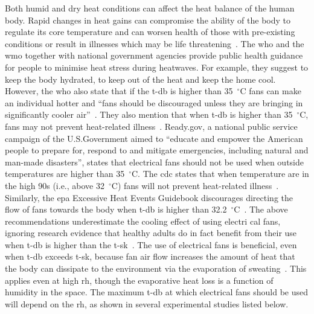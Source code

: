 Both humid and dry heat conditions can affect the heat balance of the human body.
Rapid changes in heat gains can compromise the ability of the body to regulate its core temperature and can worsen health of those with pre-existing conditions or result in illnesses which may be life threatening~\cite{WMO2015}.
The \ac{who} and the \ac{wmo} together with national government agencies provide public health guidance for people to minimise heat stress during heatwaves.
For example, they suggest to keep the body hydrated, to keep out of the heat and keep the home cool.
However, the \ac{who} also state that if the \ac{t-db} is higher than 35~$^{\circ}$C fans can make an individual hotter and ``fans should be discouraged unless they are bringing in significantly cooler air''~\cite{WMO2015}.
They also mention that when \ac{t-db} is higher than 35~$^{\circ}$C, fans may not prevent heat-related illness~\cite{HeatandH28:online}.
Ready.gov, a national public service campaign of the U.S.\@ Government aimed to ``educate and empower the American people to prepare for, respond to and mitigate emergencies, including natural and man-made disasters'', states that electrical fans should not be used when outside temperatures are higher than 35~$^{\circ}$C\@.
The \ac{cdc} states that when temperature are in the high 90s (i.e., above 32~$^{\circ}$C) fans will not prevent heat-related illness~\cite{ExtremeH66:online}.
Similarly, the \ac{epa} Excessive Heat Events Guidebook discourages directing the flow of fans towards the body when \ac{t-db} is higher than 32.2~$^{\circ}$C~\cite{UnitedStatesEnvironmentalProtectionAgency2006}.
The above recommendations underestimate the cooling effect of using electri cal fans, ignoring research evidence that healthy adults do in fact benefit from their use when \ac{t-db} is higher than the \ac{t-sk}~\cite{Rate2015, Jay2015, Jay2019a, Rate2015, Gagnon2017}.
The use of electrical fans is beneficial, even when \ac{t-db} exceeds \ac{t-sk}, because fan air flow increases the amount of heat that the body can dissipate to the environment via the evaporation of sweating~\cite{Jay2015}.
This applies even at high \ac{rh}, though the evaporative heat loss is a function of humidity in the space.
The maximum \ac{t-db} at which electrical fans should be used will depend on the \ac{rh}, as shown in several experimental studies listed below.

